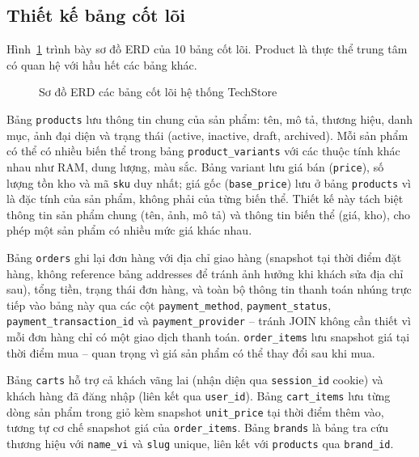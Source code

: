 \subsection{Thiết kế bảng cốt lõi}

Hình~\ref{fig:erd_core} trình bày sơ đồ ERD của 10 bảng cốt lõi. Product là thực thể trung tâm có quan hệ với hầu hết các bảng khác.

\begin{figure}[H]
  \centering
  \caption{Sơ đồ ERD các bảng cốt lõi hệ thống TechStore}
  \label{fig:erd_core}
\end{figure}

Bảng \texttt{products} lưu thông tin chung của sản phẩm: tên, mô tả, thương hiệu, danh mục, ảnh đại diện và trạng thái (active, inactive, draft, archived). Mỗi sản phẩm có thể có nhiều biến thể trong bảng \texttt{product\_variants} với các thuộc tính khác nhau như RAM, dung lượng, màu sắc. Bảng variant lưu giá bán (\texttt{price}), số lượng tồn kho và mã \texttt{sku} duy nhất; giá gốc (\texttt{base\_price}) lưu ở bảng \texttt{products} vì là đặc tính của sản phẩm, không phải của từng biến thể. Thiết kế này tách biệt thông tin sản phẩm chung (tên, ảnh, mô tả) và thông tin biến thể (giá, kho), cho phép một sản phẩm có nhiều mức giá khác nhau.

Bảng \texttt{orders} ghi lại đơn hàng với địa chỉ giao hàng (snapshot tại thời điểm đặt hàng, không reference bảng addresses để tránh ảnh hưởng khi khách sửa địa chỉ sau), tổng tiền, trạng thái đơn hàng, và toàn bộ thông tin thanh toán nhúng trực tiếp vào bảng này qua các cột \texttt{payment\_method}, \texttt{payment\_status}, \texttt{payment\_transaction\_id} và \texttt{payment\_provider} -- tránh JOIN không cần thiết vì mỗi đơn hàng chỉ có một giao dịch thanh toán. \texttt{order\_items} lưu snapshot giá tại thời điểm mua -- quan trọng vì giá sản phẩm có thể thay đổi sau khi mua.

Bảng \texttt{carts} hỗ trợ cả khách vãng lai (nhận diện qua \texttt{session\_id} cookie) và khách hàng đã đăng nhập (liên kết qua \texttt{user\_id}). Bảng \texttt{cart\_items} lưu từng dòng sản phẩm trong giỏ kèm snapshot \texttt{unit\_price} tại thời điểm thêm vào, tương tự cơ chế snapshot giá của \texttt{order\_items}. Bảng \texttt{brands} là bảng tra cứu thương hiệu với \texttt{name\_vi} và \texttt{slug} unique, liên kết với \texttt{products} qua \texttt{brand\_id}.

